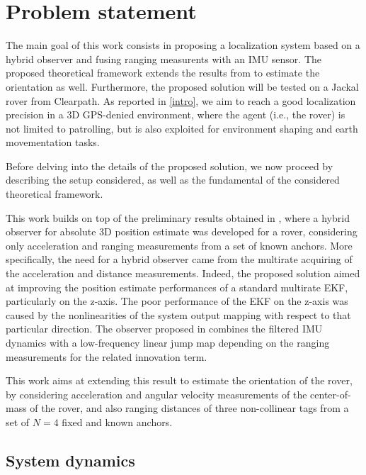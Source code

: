 \section{Problem statement}
\label{probstat}

The main goal of this work consists in proposing a localization system based on a hybrid observer and fusing ranging measurents with an IMU sensor. The proposed theoretical framework extends the results from \cite{Oliva03} to estimate the orientation as well. Furthermore, the proposed solution will be tested on a Jackal rover from Clearpath. As reported in \ref{intro}, we aim to reach a good localization precision in a 3D GPS-denied environment, where the agent (i.e., the rover) is not limited to patrolling, but is also exploited for environment shaping and earth movementation tasks.

\medskip
Before delving into the details of the proposed solution, we now proceed by describing the setup considered, as well as the fundamental of the considered theoretical framework.

\medskip
This work builds on top of the preliminary results obtained in \cite{Oliva03}, where a hybrid observer for absolute 3D position estimate was developed for a rover, considering only acceleration and ranging measurements from a set of known anchors. More specifically, the need for a hybrid observer came from the multirate acquiring of the acceleration and distance measurements. Indeed, the proposed solution aimed at improving the position estimate performances of a standard multirate EKF, particularly on the z-axis. The poor performance of the EKF on the z-axis was caused by the nonlinearities of the system output mapping with respect to that particular direction. The observer proposed in \cite{Oliva03} combines the filtered IMU dynamics with a low-frequency linear jump map depending on the ranging measurements for the related innovation term.

\medskip
This work aims at extending this result to estimate the orientation of the rover, by considering acceleration and angular velocity measurements of the center-of-mass of the rover, and also ranging distances of three non-collinear tags from a set of $N=4$ fixed and known anchors.

\subsection{System dynamics}
\label{probstat:dynamics}

